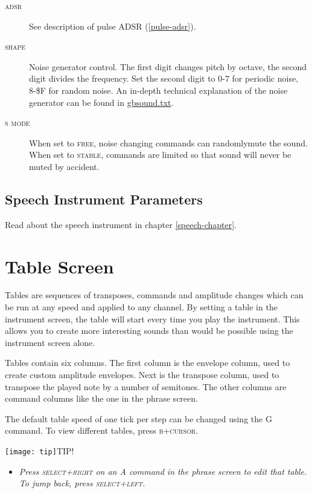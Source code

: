\begin{description}
	\item[\textsc{adsr}] See description of pulse ADSR (\ref{pulse-adsr}).
	\item[\textsc{shape}] Noise generator control. The first digit changes pitch by octave, the second digit divides the frequency. Set the second digit to 0-7 for periodic noise, 8-\$F for random noise.
        An in-depth technical explanation of the noise generator can be found in \href{http://www.devrs.com/gb/files/hosted/GBSOUND.txt}{gbsound.txt}.
	\item[\textsc{s mode}] When set to \textsc{free}, noise changing commands can randomly\footnotemark mute the sound. When set to \textsc{stable}, commands are limited so that sound will never be muted by accident.
\end{description}

\subsection{Speech Instrument Parameters}

Read about the speech instrument in chapter \ref{speech-chapter}.

\section{Table Screen}

Tables are sequences of transposes, commands and amplitude changes which can be run at any speed and applied to any channel. By setting a table in the instrument screen, the table will start every time you play the instrument. This allows you to create more interesting sounds than would be possible using the instrument screen alone.

Tables contain six columns. The first column is the envelope column, used to create custom amplitude envelopes. Next is the transpose column, used to transpose the played note by a number of semitones. The other columns are command columns like the one in the phrase screen.

The default table speed of one tick per step can be changed using the G command. To view different tables, press \textsc{b+cursor}.

\texttt{[image: tip]}TIP!
\begin{itemize}
	\item \textit{Press \textsc{select+right} on an A command in the phrase screen to edit that table. To jump back, press \textsc{select+left}.}
\end{itemize}

